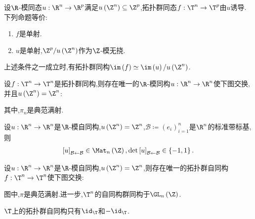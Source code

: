 \begin{proposition}{}{}
	设$\R$-模同态$u:\R^{n}\to\R^{p}$满足$u\left(\Z^{n}\right)\subseteq\Z^{p}$,拓扑群同态$f:\T^{n}\to\T^{p}$由$u$诱导.下列命题等价:
	\begin{enumerate}
		\item $f$是单射.
		\item $u$是单射,$\Z^{p}/u\left(\Z^{n}\right)$作为$\Z$-模无挠.
	\end{enumerate}
	上述条件之一成立时,有拓扑群同构$\im\left(f\right)\simeq\im\left(u\right)/u\left(\Z^{n}\right)$.
\end{proposition}

\begin{proposition}{}{}
	设$f:\T^{n}\to\T^{n}$是拓扑群同构,则存在唯一的$\R$-模同构$u:\R^{n}\to\R^{n}$使下图交换,并且$u\left(\Z^{n}\right)=\Z^{n}$:
	\begin{center}
	\end{center}
	其中,$\pi_{n}$是典范满射.
\end{proposition}

\begin{proposition}{}{}
	设$u:\R^{n}\to\R^{n}$是$\R$-模自同构,$u\left(\Z^{n}\right)=\Z^{n}$,$\mathcal{B}\coloneq\left(e_{i}\right)_{i=1}^{n}$是$\R^{n}$的标准带标基,则
	\begin{align*}
		\left[u\right]_{\mathcal{B}\leftarrow\mathcal{B}}\in\Mat_{n}\left(\Z\right),\det\left[u\right]_{\mathcal{B}\leftarrow\mathcal{B}}\in\left\{-1,1\right\}.
	\end{align*}
\end{proposition}

\begin{proposition}{}{}
	设$u:\R^{n}\to\R^{n}$是$\R$-模自同构,$u\left(\Z^{n}\right)=\Z^{n}$,则存在唯一的拓扑群自同构$f:\T^{n}\to\T^{n}$使下图交换:
	\begin{center}
	\end{center}
	图中,$\pi$是典范满射.进一步,$\T^{n}$的自同构群同构于$\GL_{n}\left(\Z\right)$.
\end{proposition}

\begin{corollary}{}{}
	$\T$上的拓扑群自同构只有$\id_{\T}$和$-\id_{\T}$.
\end{corollary}
